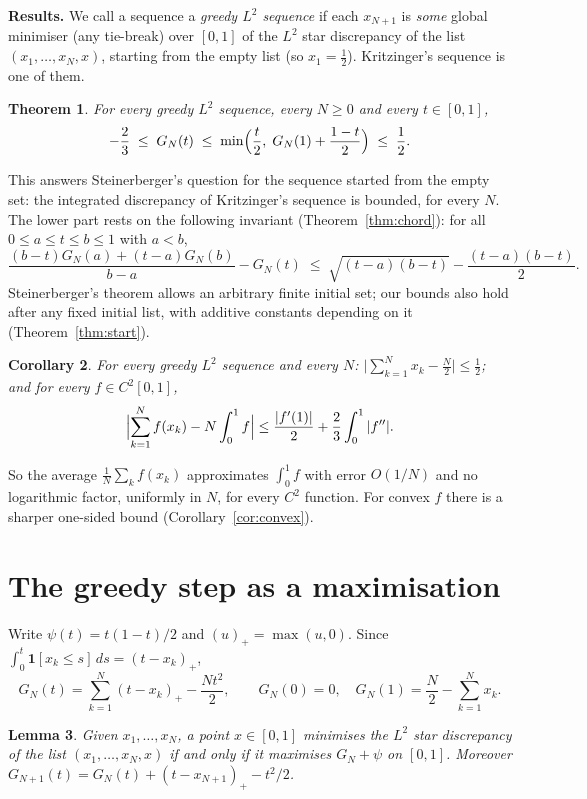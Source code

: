 \documentclass[11pt]{amsart}
\newtheorem{theorem}{Theorem}
\newtheorem{lemma}[theorem]{Lemma}
\newtheorem{corollary}[theorem]{Corollary}
\theoremstyle{remark}
\begin{document}
\medskip
\noindent\textbf{Results.} We call a sequence a \emph{greedy $L^2$ sequence} if
each $x_{N+1}$ is \emph{some} global minimiser (any tie-break) over $[0,1]$ of
the $L^2$ star discrepancy of the list $(x_1,\dots,x_N,x)$, starting from the
empty list (so $x_1=\frac12$). Kritzinger's sequence is one of them.

\begin{theorem}\label{thm:main}
For every greedy $L^2$ sequence, every $N\ge0$ and every $t\in[0,1]$,
\[
-\frac23\;\le\;G_N(t)\;\le\;\min\Bigl(\frac t2,\;G_N(1)+\frac{1-t}{2}\Bigr)\;\le\;\frac12 .
\]
\end{theorem}

This answers Steinerberger's question for the sequence started from the empty
set: the integrated discrepancy of Kritzinger's sequence is bounded, for every
$N$. The lower part rests on the following invariant (Theorem~\ref{thm:chord}): for all $0\le a\le t\le b\le1$
with $a<b$,
\[
\frac{(b-t)G_N(a)+(t-a)G_N(b)}{b-a}-G_N(t)\;\le\;\sqrt{(t-a)(b-t)}-\frac{(t-a)(b-t)}{2} .
\]
Steinerberger's theorem allows an arbitrary finite initial set; our bounds also
hold after any fixed initial list, with additive constants depending on it
(Theorem~\ref{thm:start}).

\begin{corollary}\label{cor}
For every greedy $L^2$ sequence and every $N$:
$\bigl|\sum_{k=1}^N x_k-\frac N2\bigr|\le\frac12$; and for every
$f\in C^2[0,1]$,
\[
\Bigl|\sum_{k=1}^N f(x_k)-N\int_0^1 f\Bigr|\le \frac{|f'(1)|}{2}+\frac23\int_0^1|f''| .
\]
\end{corollary}

So the average $\frac1N\sum_k f(x_k)$ approximates $\int_0^1f$ with error
$O(1/N)$ and no logarithmic factor, uniformly in $N$, for every $C^2$
function. For convex $f$ there is a sharper one-sided bound
(Corollary~\ref{cor:convex}).

\section{The greedy step as a maximisation}

Write $\psi(t)=t(1-t)/2$ and $(u)_+=\max(u,0)$. Since
$\int_0^t \mathbf 1[x_k\le s]\,ds=(t-x_k)_+$,
\[
G_N(t)=\sum_{k=1}^N (t-x_k)_+-\frac{N t^2}{2},\qquad G_N(0)=0,\quad
G_N(1)=\frac N2-\sum_{k=1}^N x_k .
\]

\begin{lemma}\label{lem:step}
Given $x_1,\dots,x_N$, a point $x\in[0,1]$ minimises the $L^2$ star
discrepancy of the list $(x_1,\dots,x_N,x)$ if and only if it maximises
$G_N+\psi$ on $[0,1]$. Moreover $G_{N+1}(t)=G_N(t)+(t-x_{N+1})_+-t^2/2$.
\end{lemma}
\end{document}
